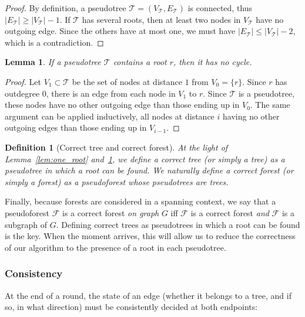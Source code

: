 \documentclass[twocolumn]{article}
\newtheorem{definition}{Definition}
\newtheorem{lemma}{Lemma}
\newcommand{\T}{\mathcal{T}}
\newcommand{\F}{\mathcal{F}}
\begin{document}
\begin{proof}
   By definition, a pseudotree $\T=(V_\T, E_\T)$ is connected, thus $\vert E_\T \vert \geq \vert V_\T \vert - 1$. If $\T$ has several roots, then at least two nodes in $V_\T$ have no outgoing edge. Since the others have at most one, we must have $\vert E_\T \vert \leq \vert V_\T \vert - 2$, which is a contradiction.
 \end{proof}


\begin{lemma}
\label{lem:pseudotree_tree}
If a pseudotree $\T$ contains a root $r$, then it has no cycle.
\end{lemma}

\begin{proof} Let $V_1 \subset \T$ be the set of nodes at distance $1$ from $V_0=\{r\}$. Since $r$ has outdegree $0$, there is an edge from each node in $V_1$ to $r$. Since $\T$ is a pseudotree, these nodes have no other outgoing edge than those ending up in $V_{0}$. The same argument can be applied inductively, all nodes at distance $i$ having no other outgoing edges than those ending up in $V_{i-1}$.
 \end{proof}

\begin{definition}[Correct tree and correct forest]
\label{def:forest}
At the light of Lemma~\ref{lem:one_root} and~\ref{lem:pseudotree_tree}, we define a {\em correct tree} (or simply a {\em tree}) as a pseudotree in which a root can be found. We naturally define a {\em correct forest} (or simply a {\em forest}) as a pseudoforest whose pseudotrees are trees.

\end{definition}

Finally, because forests are considered in a spanning context, we say that a pseudoforest $\F$ is a correct forest {\em on graph} $G$ iff $\F$ is a correct forest {\em and} $\F$ is a subgraph of $G$. Defining correct trees as pseudotrees in which a root can be found is the key. When the moment arrives, this will allow us to reduce the correctness of our algorithm to the presence of a root in each pseudotree.




\subsubsection{Consistency}

At the end of a round, the state of an edge (whether it belongs to a tree, and if so, in what direction) must be consistently decided at both endpoints:
\end{document}
